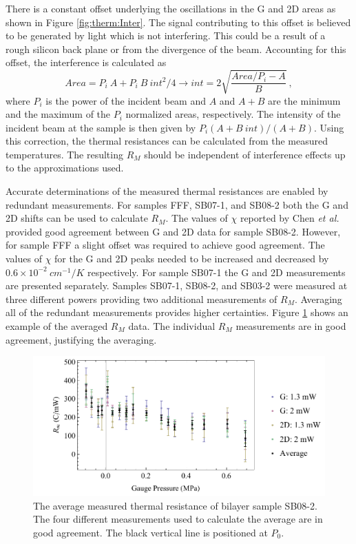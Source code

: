 There is a constant offset underlying the oscillations in the G and 2D areas as shown in Figure \ref{fig:therm:Inter}.
The signal contributing to this offset is believed to be generated by light which is not interfering.
This could be a result of a rough silicon back plane or from the divergence of the beam.
Accounting for this offset, the interference is calculated as
\begin{equation*}
	Area=P_i \ A+P_i \ B\ int^2/4 \rightarrow  int=2\sqrt{\frac{Area/P_i-A}{B}} \ ,
\end{equation*}
where $P_i$ is the power of the incident beam and $A$ and $A+B$ are the minimum and the maximum of the $P_i$ normalized areas, respectively.
The intensity of the incident beam at the sample is then given by $P_i(A+B \ int)/(A+B)$.
Using this correction, the thermal resistances can be calculated from the measured temperatures.
The resulting $R_M$ should be independent of interference effects up to the approximations used.

Accurate determinations of the measured thermal resistances are enabled by redundant measurements.
For samples FFF, SB07-1, and SB08-2 both the G and 2D shifts can be used to calculate $R_M$.
The values of $\chi$ reported by Chen \textit{et al.} \cite{Chen2011a} provided good agreement between G and 2D data for sample SB08-2.
However, for sample FFF a slight offset was required to achieve good agreement.
The values of $\chi$ for the G and 2D peaks needed to be increased and decreased by $0.6 \times 10^{-2} \ cm^{-1}/K$ respectively.
For sample SB07-1 the G and 2D measurements are presented separately.
Samples SB07-1, SB08-2, and SB03-2 were measured at three different powers providing two additional measurements of $R_M$.
Averaging all of the redundant measurements provides higher certainties.
Figure \ref{fig:therm:R_average} shows an example of the averaged $R_M$ data.
The individual $R_M$ measurements are in good agreement, justifying the averaging.

\begin{figure}
	\begin{center}
	\includegraphics[scale=0.8]{Figs_Thermal/R_average.pdf}
	\end{center}
	\caption[Average pressure dependence of the measured thermal resistance]{\label{fig:therm:R_average}
		The average measured thermal resistance of bilayer sample SB08-2.
		The four different measurements used to calculate the average are in good agreement.
		The black vertical line is positioned at $P_0$.
	}
\end{figure}


